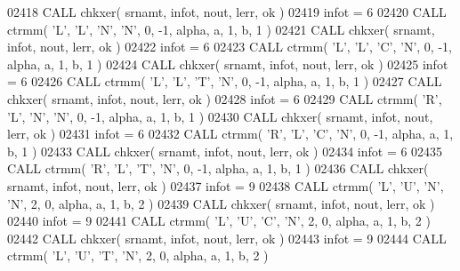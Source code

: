 \begin{DoxyCode}
02418       \textcolor{keyword}{CALL }chkxer( srnamt, infot, nout, lerr, ok )
02419       infot = 6
02420       \textcolor{keyword}{CALL }ctrmm( \textcolor{stringliteral}{'L'}, \textcolor{stringliteral}{'L'}, \textcolor{stringliteral}{'N'}, \textcolor{stringliteral}{'N'}, 0, -1, alpha, a, 1, b, 1 )
02421       \textcolor{keyword}{CALL }chkxer( srnamt, infot, nout, lerr, ok )
02422       infot = 6
02423       \textcolor{keyword}{CALL }ctrmm( \textcolor{stringliteral}{'L'}, \textcolor{stringliteral}{'L'}, \textcolor{stringliteral}{'C'}, \textcolor{stringliteral}{'N'}, 0, -1, alpha, a, 1, b, 1 )
02424       \textcolor{keyword}{CALL }chkxer( srnamt, infot, nout, lerr, ok )
02425       infot = 6
02426       \textcolor{keyword}{CALL }ctrmm( \textcolor{stringliteral}{'L'}, \textcolor{stringliteral}{'L'}, \textcolor{stringliteral}{'T'}, \textcolor{stringliteral}{'N'}, 0, -1, alpha, a, 1, b, 1 )
02427       \textcolor{keyword}{CALL }chkxer( srnamt, infot, nout, lerr, ok )
02428       infot = 6
02429       \textcolor{keyword}{CALL }ctrmm( \textcolor{stringliteral}{'R'}, \textcolor{stringliteral}{'L'}, \textcolor{stringliteral}{'N'}, \textcolor{stringliteral}{'N'}, 0, -1, alpha, a, 1, b, 1 )
02430       \textcolor{keyword}{CALL }chkxer( srnamt, infot, nout, lerr, ok )
02431       infot = 6
02432       \textcolor{keyword}{CALL }ctrmm( \textcolor{stringliteral}{'R'}, \textcolor{stringliteral}{'L'}, \textcolor{stringliteral}{'C'}, \textcolor{stringliteral}{'N'}, 0, -1, alpha, a, 1, b, 1 )
02433       \textcolor{keyword}{CALL }chkxer( srnamt, infot, nout, lerr, ok )
02434       infot = 6
02435       \textcolor{keyword}{CALL }ctrmm( \textcolor{stringliteral}{'R'}, \textcolor{stringliteral}{'L'}, \textcolor{stringliteral}{'T'}, \textcolor{stringliteral}{'N'}, 0, -1, alpha, a, 1, b, 1 )
02436       \textcolor{keyword}{CALL }chkxer( srnamt, infot, nout, lerr, ok )
02437       infot = 9
02438       \textcolor{keyword}{CALL }ctrmm( \textcolor{stringliteral}{'L'}, \textcolor{stringliteral}{'U'}, \textcolor{stringliteral}{'N'}, \textcolor{stringliteral}{'N'}, 2, 0, alpha, a, 1, b, 2 )
02439       \textcolor{keyword}{CALL }chkxer( srnamt, infot, nout, lerr, ok )
02440       infot = 9
02441       \textcolor{keyword}{CALL }ctrmm( \textcolor{stringliteral}{'L'}, \textcolor{stringliteral}{'U'}, \textcolor{stringliteral}{'C'}, \textcolor{stringliteral}{'N'}, 2, 0, alpha, a, 1, b, 2 )
02442       \textcolor{keyword}{CALL }chkxer( srnamt, infot, nout, lerr, ok )
02443       infot = 9
02444       \textcolor{keyword}{CALL }ctrmm( \textcolor{stringliteral}{'L'}, \textcolor{stringliteral}{'U'}, \textcolor{stringliteral}{'T'}, \textcolor{stringliteral}{'N'}, 2, 0, alpha, a, 1, b, 2 )

\end{DoxyCode}
